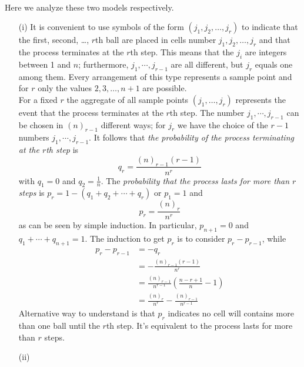 \documentclass{article}
\numberwithin{equation}{subsection}
\begin{document}
			\paragraph{} Here we analyze these two models respectively.
			\begin{enumerate}
			\item[(i)] It is convenient to use symbols of the form $(j_1,j_2,\dots,j_r)$ to indicate that the first, second, \dots, $r$th ball are placed in cells number $j_1,j_2,\dots,j_r$ and that the process terminates at the $r$th step. This means that the $j_i$ are integers between 1 and $n$; furthermore, $j_1,\cdots,j_{r-1}$ are all different, but $j_r$ equals one among them. Every arrangement of this type represents a sample point and for $r$ only the values $2,3,\dots,n+1$ are possible. 
			\medskip \\ For a fixed $r$ the aggregate of all sample points $(j_1,\dots,j_r)$ represents the event that the process terminates at the $r$th step. The number $j_1,\cdots,j_{r-1}$ can be chosen in $(n)_{r-1}$ different ways; for $j_r$ we have the choice of the $r-1$ numbers $j_1,\cdots,j_{r-1}$. It follows that \textit{the probability of the process terminating at the $r$th step} is
			\begin{equation}
				\label{eq:2.7.1}
				q_r=\frac{(n)_{r-1}(r-1)}{n^r}
			\end{equation} with $q_1=0$ and $q_2=\frac{1}{n}$. The \textit{probability that the process lasts for more than $r$ steps} is $p_r=1-(q_1+q_2+\cdots+q_r)$ or $p_1=1$ and 
			\begin{equation}
				\label{eq:2.7.2}
				p_r = \frac{(n)_r}{n^r}
			\end{equation}
			as can be seen by simple induction. In particular, $p_{n+1}=0$ and $q_1+\cdots+q_{n+1}=1$. The induction to get $p_r$ is to consider $p_r-p_{r-1}$, while
			\begin{equation}
			\begin{aligned}
				p_r-p_{r-1} &= -q_r \\ &= -\frac{(n)_{r-1}(r-1)}{n^r} \\ &=\frac{(n)_{r-1}}{n^{r-1}}\left(\frac{n-r+1}{n}-1\right) \\ &= \frac{(n)_{r}}{n^{r}}-\frac{(n)_{r-1}}{n^{r-1}}
			\end{aligned}
			\end{equation}
			Alternative way to understand is that $p_r$ indicates no cell will contains more than one ball until the $r$th step. It's equivalent to the process lasts for more than $r$ steps.
			\item[(ii)]
			\end{enumerate}
\end{document}
